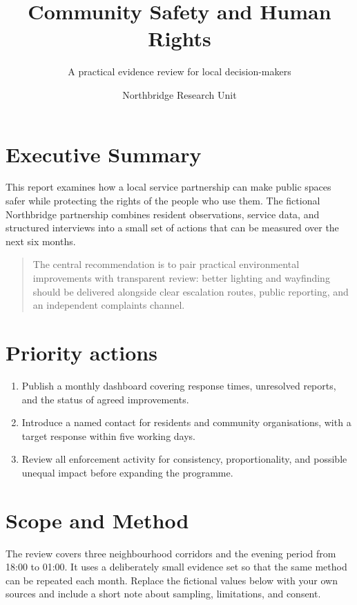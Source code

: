 \documentclass[freefonts,nologo]{amnestyreport}
\title{Community Safety and Human Rights}
\subtitle{A practical evidence review for local decision-makers}
\author{Northbridge Research Unit}
\begin{document}
\frontmatter
\maketitle
\tableofcontents

\mainmatter
\section{Executive Summary}

This report examines how a local service partnership can make public spaces safer
while protecting the rights of the people who use them. The fictional Northbridge
partnership combines resident observations, service data, and structured interviews
into a small set of actions that can be measured over the next six months.

\begin{quote}
The central recommendation is to pair practical environmental improvements with
transparent review: better lighting and wayfinding should be delivered alongside
clear escalation routes, public reporting, and an independent complaints channel.
\end{quote}

\section*{Priority actions}
\begin{enumerate}[leftmargin=*,itemsep=4pt]
  \item Publish a monthly dashboard covering response times, unresolved reports,
        and the status of agreed improvements.
  \item Introduce a named contact for residents and community organisations,
        with a target response within five working days.
  \item Review all enforcement activity for consistency, proportionality, and
        possible unequal impact before expanding the programme.
\end{enumerate}

\section{Scope and Method}

The review covers three neighbourhood corridors and the evening period from
18:00 to 01:00. It uses a deliberately small evidence set so that the same
method can be repeated each month. Replace the fictional values below with your
own sources and include a short note about sampling, limitations, and consent.
\end{document}
